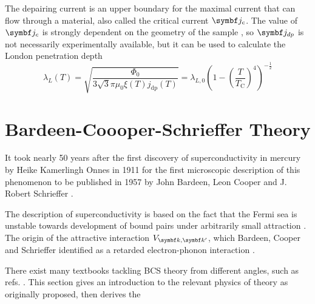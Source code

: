 \documentclass[../notes.tex]{subfiles}
\begin{document}
The depairing current is an upper boundary for the maximal current that can flow through a material, also called the critical current \(\vb{j}_c\).
The value of \(\vb{j}_c\) is strongly dependent on the geometry of the sample \cite{bardeenCriticalFieldsCurrents1962, xuAchievingTheoreticalDepairing2010}, so \(\vb{j}_{dp}\) is not necessarily experimentally available, but it can be used to calculate the London penetration depth \cite{tinkhamIntroductionSuperconductivity1996}
\begin{equation}
	\lambda_L (T) = \sqrt{\frac{\Phi_0}{3 \sqrt{3} \pi \mu_0 \xi(T) j_{\mathrm{dp}} (T)}} = \lambda_{L,0} \left( 1 - \left( \frac{T}{T_{\mathrm{C}}}\right)^4 \right)^{-\frac{1}{2}} 
\end{equation}




\section{Bardeen-Coooper-Schrieffer Theory}\label{sec:bcs-theory}

It took nearly 50 years after the first discovery of superconductivity in mercury by Heike Kamerlingh Onnes in 1911 \cite{onnesFurtherExperimentsLiquid1991} for the first microscopic description of this phenomenon to be published in 1957 by John Bardeen, Leon Cooper and J. Robert Schrieffer \cite{bardeenTheorySuperconductivity1957}.

The  description of superconductivity is based on the fact that the Fermi sea is unstable towards development of bound pairs under arbitrarily small attraction \cite{cooperBoundElectronPairs1956}.
The origin of the attractive interaction \(V_{{\vb{k}, \vb{k}^{\prime}}}\), which Bardeen, Cooper and Schrieffer identified as a retarded electron-phonon interaction \cite{bardeenTheorySuperconductivity1957}.

There exist many textbooks tackling BCS theory from different angles, such as refs. \cite{colemanIntroductionManyBodyPhysics2015, tinkhamIntroductionSuperconductivity1996}.
This section gives an introduction to the relevant physics of  theory as originally proposed, then derives the 

\end{document}

